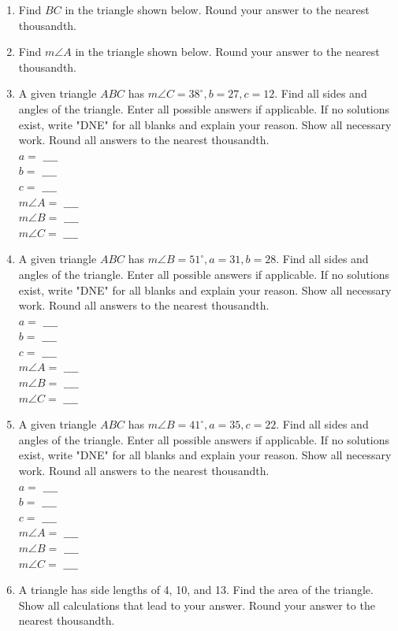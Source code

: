 \documentclass[10pt]{article}
\begin{document}
\begin{enumerate}
  \item Find $B C$ in the triangle shown below. Round your answer to the nearest thousandth.
  \item Find $m \angle A$ in the triangle shown below. Round your answer to the nearest thousandth.
  \item A given triangle $A B C$ has $m \angle C=38^{\circ}, b=27, c=12$. Find all sides and angles of the triangle. Enter all possible answers if applicable. If no solutions exist, write "DNE" for all blanks and explain your reason. Show all necessary work. Round all answers to the nearest thousandth.\\
$a=$ $\_\_\_\_$\\
$b=$ $\_\_\_\_$\\
$c=$ $\_\_\_\_$\\
$m \angle A=$ $\_\_\_\_$\\
$m \angle B=$ $\_\_\_\_$\\
$m \angle C=$ $\_\_\_\_$
  \item A given triangle $A B C$ has $m \angle B=51^{\circ}, a=31, b=28$. Find all sides and angles of the triangle. Enter all possible answers if applicable. If no solutions exist, write "DNE" for all blanks and explain your reason. Show all necessary work. Round all answers to the nearest thousandth.\\
$a=$ $\_\_\_\_$\\
$b=$ $\_\_\_\_$\\
$c=$ $\_\_\_\_$\\
$m \angle A=$ $\_\_\_\_$\\
$m \angle B=$ $\_\_\_\_$\\
$m \angle C=$ $\_\_\_\_$
  \item A given triangle $A B C$ has $m \angle B=41^{\circ}, a=35, c=22$. Find all sides and angles of the triangle. Enter all possible answers if applicable. If no solutions exist, write "DNE" for all blanks and explain your reason. Show all necessary work. Round all answers to the nearest thousandth.\\
$a=$ $\_\_\_\_$\\
$b=$ $\_\_\_\_$\\
$c=$ $\_\_\_\_$\\
$m \angle A=$ $\_\_\_\_$\\
$m \angle B=$ $\_\_\_\_$\\
$m \angle C=$ $\_\_\_\_$
  \item A triangle has side lengths of 4, 10, and 13. Find the area of the triangle. Show all calculations that lead to your answer. Round your answer to the nearest thousandth.
\end{enumerate}
\end{document}
